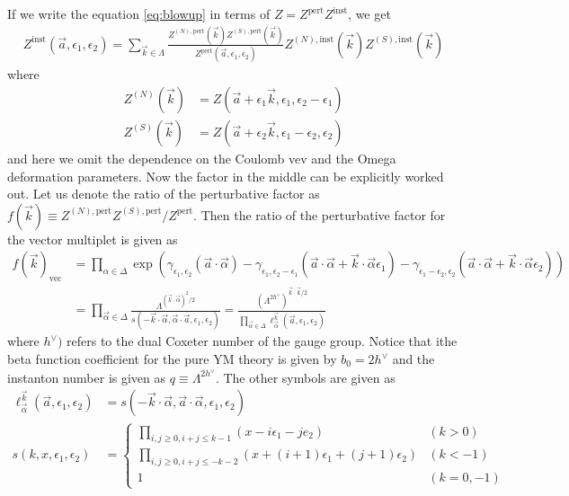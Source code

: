 \documentclass[letterpaper, 11pt]{article}
\def\a{\alpha}
\def\g{\gamma}
\def\e{\epsilon}
\begin{document}
If we write the equation \eqref{eq:blowup} in terms of $Z = Z^{\textrm{pert}} Z^{\textrm{inst}}$, we get
\begin{align}
 Z^{\textrm{inst}}(\vec{a}, \e_1, \e_2) = \sum_{\vec{k} \in \Lambda} \frac{Z^{(N), \textrm{pert}}(\vec{k}) Z^{(S), \textrm{pert}}(\vec{k})}{Z^{\textrm{pert}}(\vec{a}, \e_1, \e_2)} Z^{(N), \textrm{inst}}(\vec{k} ) Z^{(S), \textrm{inst}}(\vec{k})
\end{align}
where
\begin{align}
 Z^{(N)} (\vec{k}) &= Z(\vec{a}+ \e_1 \vec{k}, \e_1, \e_2 - \e_1) \\
 Z^{(S)} (\vec{k}) &= Z(\vec{a} + \e_2 \vec{k}, \e_1 - \e_2, \e_2)
\end{align}
and here we omit the dependence on the Coulomb vev and the Omega deformation parameters. 
Now the factor in the middle can be explicitly worked out. Let us denote the ratio of the perturbative factor as $f(\vec{k}) \equiv Z^{(N), \textrm{pert}} Z^{(S), \textrm{pert}}/Z^{\textrm{pert}}$. 
Then the ratio of the perturbative factor for the vector multiplet is given as
\begin{align} \label{eq:1loopvec}
f(\vec{k})_{\textrm{vec}} &= \prod_{\a \in \Delta} \exp \left( \g_{\e_1, \e_2} (\vec{a}\cdot \vec{\a}) - \g_{\e_1, \e_2 - \e_1}(\vec{a}\cdot \vec{\a} + \vec{k}\cdot\vec{\a} \e_1) -  \g_{\e_1 - \e_2, \e_2 }(\vec{a}\cdot \vec{\a} +  \vec{k}\cdot\vec{\a} \e_2)   \right) \\
 &= \prod_{\vec{\a} \in \Delta}  \frac{\Lambda^{(\vec{k} \cdot \vec{\a})^2 /2} }{s(-\vec{k}\cdot \vec{\a}, \vec{\a}\cdot \vec{a}, \e_1, \e_2) }
 = \frac{(\Lambda^{2 h^\vee})^{\vec{k} \cdot \vec{k}/2} }{\prod_{\vec{\a} \in \Delta} \ell^{\vec{k}}_{\vec{\a}} (\vec{a}, \e_1, \e_2) }
\end{align}
where $h^\vee)$ refers to the dual Coxeter number of the gauge group. Notice that ithe beta function coefficient for the pure YM theory is given by $b_0 = 2h^\vee$ and the instanton number is given as $q \equiv \Lambda^{2 h^\vee}$. The other symbols are given as 
\begin{align}
\ell^{\vec{k}}_{\vec{\alpha}} (\vec{a}, \e_1, \e_2) &= s(-\vec{k}\cdot\vec{\a}, \vec{a}\cdot\vec{\a}, \e_1, \e_2) \\
s(k, x, \e_1, \e_2) &= 
\begin{cases}
 {\displaystyle \prod_{i, j \ge 0, i+j \le k-1} (x - i \e_1 - j e_2) } & (k > 0) \\
 {\displaystyle \prod_{i, j \ge 0, i+j \le -k-2} (x + (i+1)\e_1 + (j+1)\e_2)} & (k < -1)  \\
 1 & (k=0, -1)
\end{cases}
\end{align}
\end{document}
